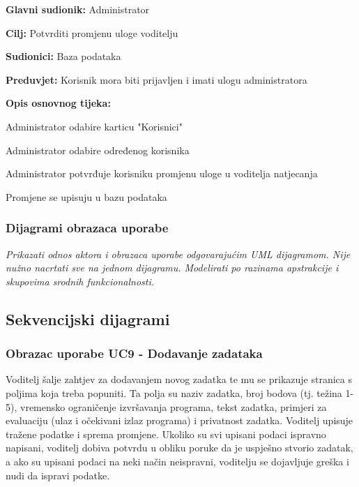 					\noindent {}
					\begin{packed_item}
						
						\item \textbf{Glavni sudionik: }Administrator
						\item  \textbf{Cilj:} Potvrditi promjenu uloge voditelju
						\item  \textbf{Sudionici:} Baza podataka
						\item  \textbf{Preduvjet:} Korisnik mora biti prijavljen i imati ulogu administratora
						\item  \textbf{Opis osnovnog tijeka:}
						
						\item[] \begin{packed_enum}
							
							\item Administrator odabire karticu "Korisnici"
							\item Administrator odabire određenog korisnika
							\item Administrator potvrđuje korisniku promjenu uloge u voditelja natjecanja
							\item Promjene se upisuju u bazu podataka
						\end{packed_enum}
					\end{packed_item}
					
				\subsubsection{Dijagrami obrazaca uporabe}
					
					\textit{Prikazati odnos aktora i obrazaca uporabe odgovarajućim UML dijagramom. Nije nužno nacrtati sve na jednom dijagramu. Modelirati po razinama apstrakcije i skupovima srodnih funkcionalnosti.}
				\eject		
				
			\subsection{Sekvencijski dijagrami}
			
				
				\subsubsection{Obrazac uporabe UC9 - Dodavanje zadataka}
				
				\noindent Voditelj šalje zahtjev za dodavanjem novog zadatka te mu se prikazuje stranica s poljima koja treba popuniti. Ta polja su naziv zadatka, broj bodova (tj. težina 1-5), vremensko ograničenje izvršavanja programa, tekst zadatka, primjeri za evaluaciju (ulaz i očekivani izlaz programa) i privatnost zadatka. Voditelj upisuje tražene podatke i sprema promjene. Ukoliko su svi upisani podaci ispravno napisani, voditelj dobiva potvrdu u obliku poruke da je uspješno stvorio zadatak, a ako su upisani podaci na neki način neispravni, voditelju se dojavljuje greška i nudi da ispravi podatke. 
				
